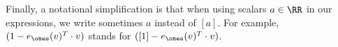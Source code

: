 %
%
%
%
%
Finally, a notational simplification is that when using scalars $a\in\RR$ in our expressions, we write sometimes
$a$ instead of $[a]$. For example,  $(1-e_{\ones}(v)^T\cdot v)$ stands for  $([1]-e_{\ones}(v)^T\cdot v)$.

%
